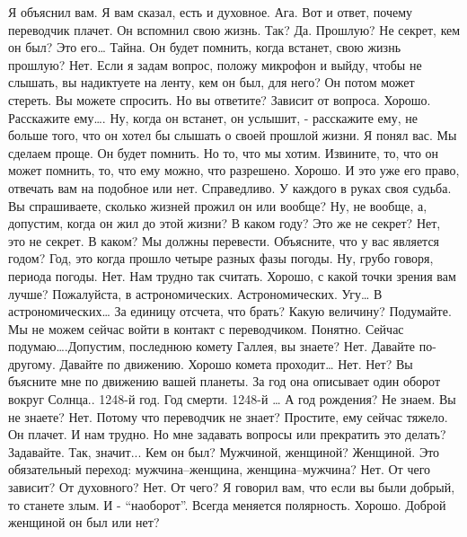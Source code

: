 \documentclass{extbook}
\newcommand{\soul}[1]{{#1}}
\newcommand{\people}[1]{{#1}}
\begin{document}
\soul{Я объяснил вам.  Я вам сказал, есть и  духовное.}
\people{Ага.}
\soul{Вот и ответ, почему переводчик плачет.}
\people{Он вспомнил свою жизнь. Так?}
\soul{Да.}
\people{Прошлую? Не секрет, кем он был?}
\soul{Это его… }
\people{ Тайна. Он будет помнить, когда встанет, свою жизнь прошлую?}
\soul{Нет.}
\people{Если я задам вопрос,  положу микрофон  и выйду, чтобы не слышать, вы надиктуете на ленту,  кем он был, для него? Он потом может стереть.}
\soul{Вы можете спросить.}
\people{Но вы ответите?}
\soul{Зависит от вопроса.}
\people{Хорошо. Расскажите ему…. Ну, когда он встанет, он услышит, -  расскажите ему,  не больше того,  что он хотел бы слышать о своей прошлой жизни.}
\soul{Я понял вас. Мы сделаем проще. Он будет помнить. Но то, что мы хотим. Извините, то, что он может помнить, то, что ему можно, что разрешено. }
\people{Хорошо.}
\soul{И это уже его право, отвечать вам на подобное или нет.}
\people{Справедливо. У каждого в руках своя судьба.}
\soul{Вы спрашиваете, сколько жизней прожил он или  вообще?}
\people{Ну, не вообще, а, допустим, когда он жил до этой жизни? В каком году? Это же не секрет?}
\soul{Нет, это не секрет.}
\people{В каком?}
\soul{Мы  должны перевести. Объясните, что  у вас является годом?}
\people{Год, это когда прошло четыре разных фазы погоды. Ну, грубо говоря, периода погоды.}
\soul{Нет. Нам трудно так считать.}
\people{Хорошо, с какой точки зрения вам лучше?}
\soul{Пожалуйста,  в астрономических.}
\people{Астрономических. Угу… В астрономических… За единицу отсчета, что брать? Какую величину?}
\soul{Подумайте. Мы не можем сейчас войти  в контакт с переводчиком.}
\people{Понятно. Сейчас подумаю….Допустим,  последнюю комету Галлея, вы знаете?}
\soul{Нет. Давайте по-другому. Давайте по движению.}
\people{Хорошо комета проходит…}
\soul{ Нет.}
\people{Нет?}
\soul{Вы бъясните мне по движению вашей планеты.}
\people{За год она описывает один оборот  вокруг  Солнца..}
\soul{1248-й год. Год смерти. }
\people{1248-й …   А год рождения? }
\soul{Не знаем.}
\people{Вы не знаете?}
\soul{Нет.}
\people{Потому что переводчик не знает?}
\soul{Простите, ему сейчас тяжело. Он плачет.  И нам трудно.}
\people{Но мне задавать вопросы или прекратить это делать?}
\soul{Задавайте.}
\people{Так, значит... Кем он был? Мужчиной, женщиной?}
\soul{Женщиной.}
\people{Это обязательный переход: мужчина–женщина, женщина–мужчина?}
\soul{Нет.}
\people{От чего зависит? От духовного? }
\soul{Нет.}
\people{От чего?}
\soul{Я говорил вам, что если вы были добрый, то станете злым. И - ``наоборот''. Всегда меняется полярность.}
\people{Хорошо. Доброй женщиной он был или нет?}
\end{document}
